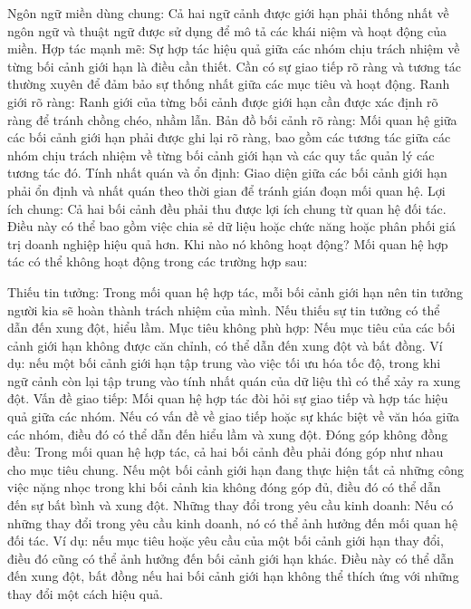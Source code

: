 Ngôn ngữ miền dùng chung: Cả hai ngữ cảnh được giới hạn phải thống nhất về ngôn ngữ và thuật ngữ được sử dụng để mô tả các khái niệm và hoạt động của miền.
Hợp tác mạnh mẽ: Sự hợp tác hiệu quả giữa các nhóm chịu trách nhiệm về từng bối cảnh giới hạn là điều cần thiết. Cần có sự giao tiếp rõ ràng và tương tác thường xuyên để đảm bảo sự thống nhất giữa các mục tiêu và hoạt động.
Ranh giới rõ ràng: Ranh giới của từng bối cảnh được giới hạn cần được xác định rõ ràng để tránh chồng chéo, nhầm lẫn.
Bản đồ bối cảnh rõ ràng: Mối quan hệ giữa các bối cảnh giới hạn phải được ghi lại rõ ràng, bao gồm các tương tác giữa các nhóm chịu trách nhiệm về từng bối cảnh giới hạn và các quy tắc quản lý các tương tác đó.
Tính nhất quán và ổn định: Giao diện giữa các bối cảnh giới hạn phải ổn định và nhất quán theo thời gian để tránh gián đoạn mối quan hệ.
Lợi ích chung: Cả hai bối cảnh đều phải thu được lợi ích chung từ quan hệ đối tác. Điều này có thể bao gồm việc chia sẻ dữ liệu hoặc chức năng hoặc phân phối giá trị doanh nghiệp hiệu quả hơn.
Khi nào nó không hoạt động?
Mối quan hệ hợp tác có thể không hoạt động trong các trường hợp sau:

Thiếu tin tưởng: Trong mối quan hệ hợp tác, mỗi bối cảnh giới hạn nên tin tưởng người kia sẽ hoàn thành trách nhiệm của mình. Nếu thiếu sự tin tưởng có thể dẫn đến xung đột, hiểu lầm.
Mục tiêu không phù hợp: Nếu mục tiêu của các bối cảnh giới hạn không được căn chỉnh, có thể dẫn đến xung đột và bất đồng. Ví dụ: nếu một bối cảnh giới hạn tập trung vào việc tối ưu hóa tốc độ, trong khi ngữ cảnh còn lại tập trung vào tính nhất quán của dữ liệu thì có thể xảy ra xung đột.
Vấn đề giao tiếp: Mối quan hệ hợp tác đòi hỏi sự giao tiếp và hợp tác hiệu quả giữa các nhóm. Nếu có vấn đề về giao tiếp hoặc sự khác biệt về văn hóa giữa các nhóm, điều đó có thể dẫn đến hiểu lầm và xung đột.
Đóng góp không đồng đều: Trong mối quan hệ hợp tác, cả hai bối cảnh đều phải đóng góp như nhau cho mục tiêu chung. Nếu một bối cảnh giới hạn đang thực hiện tất cả những công việc nặng nhọc trong khi bối cảnh kia không đóng góp đủ, điều đó có thể dẫn đến sự bất bình và xung đột.
Những thay đổi trong yêu cầu kinh doanh: Nếu có những thay đổi trong yêu cầu kinh doanh, nó có thể ảnh hưởng đến mối quan hệ đối tác. Ví dụ: nếu mục tiêu hoặc yêu cầu của một bối cảnh giới hạn thay đổi, điều đó cũng có thể ảnh hưởng đến bối cảnh giới hạn khác. Điều này có thể dẫn đến xung đột, bất đồng nếu hai bối cảnh giới hạn không thể thích ứng với những thay đổi một cách hiệu quả.

